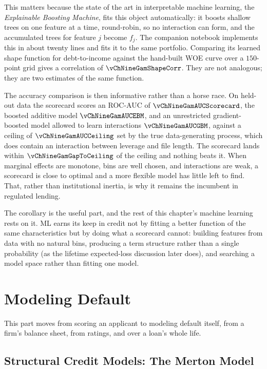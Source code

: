 \documentclass[../ai_in_finance]{subfiles}
\begin{document}
This matters because the state of the art in interpretable machine learning, the \emph{Explainable Boosting Machine}, fits this object automatically: it boosts shallow trees on one feature at a time, round-robin, so no interaction can form, and the accumulated trees for feature $j$ become $f_j$. The companion notebook implements this in about twenty lines and fits it to the same portfolio. Comparing its learned shape function for debt-to-income against the hand-built WOE curve over a $150$-point grid gives a correlation of $\vChNineGamShapeCorr$. They are not analogous; they are two estimates of the same function.

The accuracy comparison is then informative rather than a horse race. On held-out data the scorecard scores an ROC-AUC of $\vChNineGamAUCScorecard$, the boosted additive model $\vChNineGamAUCEBM$, and an unrestricted gradient-boosted model allowed to learn interactions $\vChNineGamAUCGBM$, against a ceiling of $\vChNineGamAUCCeiling$ set by the true data-generating process, which does contain an interaction between leverage and file length. The scorecard lands within $\vChNineGamGapToCeiling$ of the ceiling and nothing beats it. When marginal effects are monotone, bins are well chosen, and interactions are weak, a scorecard is close to optimal and a more flexible model has little left to find. That, rather than institutional inertia, is why it remains the incumbent in regulated lending.

The corollary is the useful part, and the rest of this chapter's machine learning rests on it. ML earns its keep in credit not by fitting a better function of the same characteristics but by doing what a scorecard cannot: building features from data with no natural bins, producing a term structure rather than a single probability (as the lifetime expected-loss discussion later does), and searching a model space rather than fitting one model.

\section{Modeling Default}

This part moves from scoring an applicant to modeling default itself, from a firm's balance sheet, from ratings, and over a loan's whole life.

\subsection{Structural Credit Models: The Merton Model}
\label{sec:merton-model}
\end{document}
